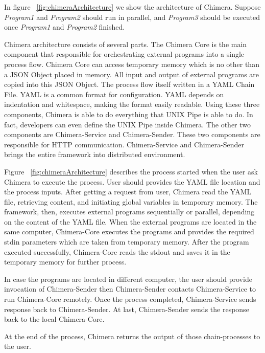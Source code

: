 \documentclass[conference]{IEEEtran}
\begin{document}
In figure ~\ref{fig:chimeraArchitecture} we show the architecture of Chimera. Suppose
{\it Program1} and {\it Program2} should run in parallel, and {\it Program3} should be
executed once {\it Program1} and {\it Program2} finished.

Chimera architecture consists of several parts. The Chimera Core is the main component 
that responsible for orchestrating external programs into a single process flow. 
Chimera Core can access temporary memory which is no other than a JSON Object placed in
memory. All input and output of external programs are copied into this JSON Object.
The process flow itself written in a YAML Chain File. YAML is a common format for
configuration. YAML depends on indentation and whitespace, making the format easily 
readable. Using these three components, Chimera is able to do everything that UNIX Pipe is able to do. 
In fact, developers can even define the UNIX Pipe inside Chimera. The other two components are Chimera-Service and Chimera-Sender. These two components are responsible for HTTP communication. Chimera-Service and Chimera-Sender brings the 
entire framework into distributed environment.

Figure ~\ref{fig:chimeraArchitecture} describes the process started when the user ask Chimera 
to execute the process. User should provides the YAML file location and the process
inputs. After getting a request from user, Chimera read the YAML file, retrieving
content, and initiating global variables in temporary memory. The framework, then,
executes external programs sequentially or parallel, depending on the content of the
YAML file. When the external programs are located in the same computer, Chimera-Core executes the
programs and provides the required stdin parameters which are taken from
temporary memory. After the program executed successfully, Chimera-Core  reads the 
stdout and saves it in the temporary memory for further process.

In case the programs are located in different computer, the user should provide
invocation of Chimera-Sender then Chimera-Sender contacts Chimera-Service to run 
Chimera-Core remotely. Once the process completed, Chimera-Service sends 
response back to Chimera-Sender. At last, Chimera-Sender sends the response back to
the local Chimera-Core.

At the end of the process, Chimera returns the output of those chain-processes to 
the user.
\end{document}

